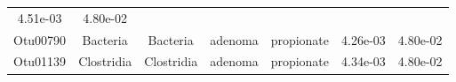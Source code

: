 \documentclass[11pt,]{article}
\begin{document}
\begin{longtable}[]{@{}ccccccc@{}}
\begin{minipage}[t]{0.09\columnwidth}
4.51e-03\strut
\end{minipage} & \begin{minipage}[t]{0.09\columnwidth}\centering\strut
4.80e-02\strut
\end{minipage}\tabularnewline
\begin{minipage}[t]{0.09\columnwidth}\centering\strut
Otu00790\strut
\end{minipage} & \begin{minipage}[t]{0.17\columnwidth}\centering\strut
Bacteria\strut
\end{minipage} & \begin{minipage}[t]{0.17\columnwidth}\centering\strut
Bacteria\strut
\end{minipage} & \begin{minipage}[t]{0.09\columnwidth}\centering\strut
adenoma\strut
\end{minipage} & \begin{minipage}[t]{0.11\columnwidth}\centering\strut
propionate\strut
\end{minipage} & \begin{minipage}[t]{0.09\columnwidth}\centering\strut
4.26e-03\strut
\end{minipage} & \begin{minipage}[t]{0.09\columnwidth}\centering\strut
4.80e-02\strut
\end{minipage}\tabularnewline
\begin{minipage}[t]{0.09\columnwidth}\centering\strut
Otu01139\strut
\end{minipage} & \begin{minipage}[t]{0.17\columnwidth}\centering\strut
Clostridia\strut
\end{minipage} & \begin{minipage}[t]{0.17\columnwidth}\centering\strut
Clostridia\strut
\end{minipage} & \begin{minipage}[t]{0.09\columnwidth}\centering\strut
adenoma\strut
\end{minipage} & \begin{minipage}[t]{0.11\columnwidth}\centering\strut
propionate\strut
\end{minipage} & \begin{minipage}[t]{0.09\columnwidth}\centering\strut
4.34e-03\strut
\end{minipage} & \begin{minipage}[t]{0.09\columnwidth}\centering\strut
4.80e-02\strut
\end{minipage}\tabularnewline

\end{longtable}
\end{document}
